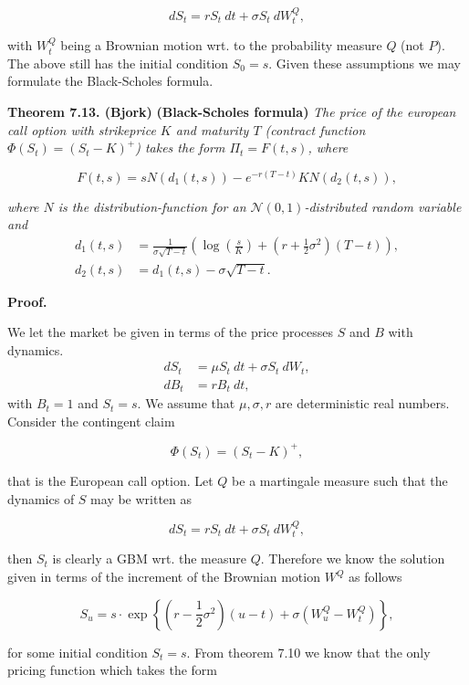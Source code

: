 \documentclass[
]{book}
\begin{document}
\[
dS_t=r S_t\ dt+\sigma S_t\ dW^Q_t,\tag{7.47}
\]

with \(W_t^Q\) being a Brownian motion wrt. to the probability measure \(Q\) (not \(P\)). The above still has the initial condition \(S_0=s\). Given these assumptions we may formulate the Black-Scholes formula.

\textbf{Theorem 7.13. (Bjork)} \textbf{(Black-Scholes formula)} \emph{The price of the european call option with strikeprice \(K\) and maturity \(T\) (contract function \(\Phi(S_t)=\left( S_t - K\right)^+\)) takes the form \(\Pi_t=F(t,s)\), where}

\[
F(t,s)=s N(d_1(t,s))-e^{-r(T-t)}KN(d_2(t,s)),\tag{7.52}
\]

\emph{where \(N\) is the distribution-function for an \(\mathcal{N}(0,1)\)-distributed random variable and}
\begin{align*}
d_1(t,s)&=\frac{1}{\sigma \sqrt{T-t}}\left(\log\left(\frac{s}{K}\right)+\left(r+\frac{1}{2}\sigma^2\right)(T-t)\right),\tag{7.53}\\
d_2(t,s)&=d_1(t,s)-\sigma\sqrt{T-t}.\tag{7.54}
\end{align*}

\noindent\makebox[\linewidth]{\rule{\textwidth}{0.4pt}}

\textbf{Proof.}

We let the market be given in terms of the price processes \(S\) and \(B\) with dynamics.
\begin{align*}
dS_t&=\mu S_t\ dt+\sigma S_t\ dW_t,\\
dB_t&=r B_t\ dt,
\end{align*}
with \(B_t=1\) and \(S_t=s\). We assume that \(\mu,\sigma, r\) are deterministic real numbers. Consider the contingent claim

\[
\Phi(S_t)=\left( S_t - K\right)^+,
\]

that is the European call option. Let \(Q\) be a martingale measure such that the dynamics of \(S\) may be written as

\[
dS_t=r S_t\ dt+\sigma S_t\ dW^Q_t,
\]

then \(S_t\) is clearly a GBM wrt. the measure \(Q\). Therefore we know the solution given in terms of the increment of the Brownian motion \(W^Q\) as follows

\[
S_u=s\cdot \exp\left\{\left(r-\frac{1}{2}\sigma^2\right)(u-t)+\sigma\left(W_u^Q-W_t^Q\right)\right\},
\]

for some initial condition \(S_t=s\). From theorem 7.10 we know that the only pricing function which takes the form
\end{document}
